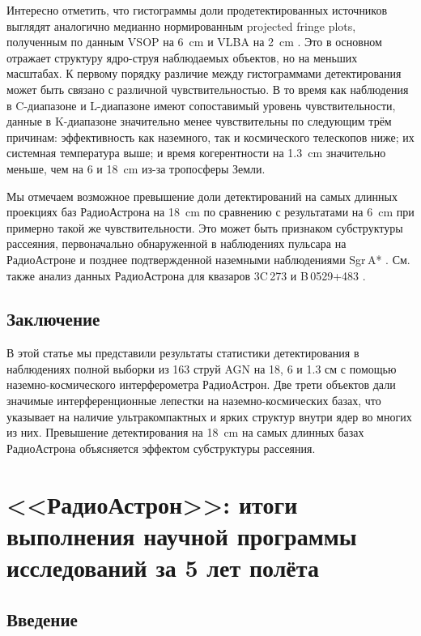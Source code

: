 Интересно отметить, что гистограммы доли продетектированных источников выглядят аналогично медианно
нормированным projected fringe plots, полученным по данным VSOP на \SI{6}{\cm} \cite{Horiuchi_2004}
и VLBA на \SI{2}{\cm} \cite{Kovalev_2005}. Это в основном отражает структуру ядро-струя наблюдаемых
объектов, но на меньших масштабах. К первому порядку различие между гистограммами детектирования
может быть связано с различной чувствительностью. В то время как наблюдения в C-диапазоне и
L-диапазоне имеют сопоставимый уровень чувствительности, данные в K-диапазоне значительно менее
чувствительны по следующим трём причинам: эффективность как наземного, так и космического телескопов
ниже; их системная температура выше; и время когерентности на \SI{1.3}{\cm} значительно меньше, чем
на 6 и \SI{18}{\cm} из-за тропосферы Земли.

Мы отмечаем возможное превышение доли детектирований на самых длинных проекциях баз РадиоАстрона на
\SI{18}{\cm} по сравнению с результатами на \SI{6}{\cm} при примерно такой же чувствительности. Это
может быть признаком субструктуры рассеяния, первоначально обнаруженной в наблюдениях пульсара на
РадиоАстроне \cite{Gwinn_2016,Popov_2017} и позднее подтвержденной наземными наблюдениями Sgr\,A*
\cite{Gwinn_2014,Johnson_2018}. См. также анализ данных РадиоАстрона для квазаров 3C\,273
\cite{Johnson_2016} и B\,0529+483 \cite{Pilipenko_2018}.

\subsection{Заключение}

В этой статье мы представили результаты статистики детектирования в наблюдениях полной выборки из
163 струй AGN на 18, 6 и 1.3 см с помощью наземно-космического интерферометра РадиоАстрон. Две трети
объектов дали значимые интерференционные лепестки на наземно-космических базах, что указывает на
наличие ультракомпактных и ярких структур внутри ядер во многих из них. Превышение детектирования на
\SI{18}{\cm} на самых длинных базах РадиоАстрона объясняется эффектом субструктуры рассеяния.


\section{<<РадиоАстрон>>: итоги выполнения научной программы исследований за 5 лет полёта}

\subsection{Введение}

